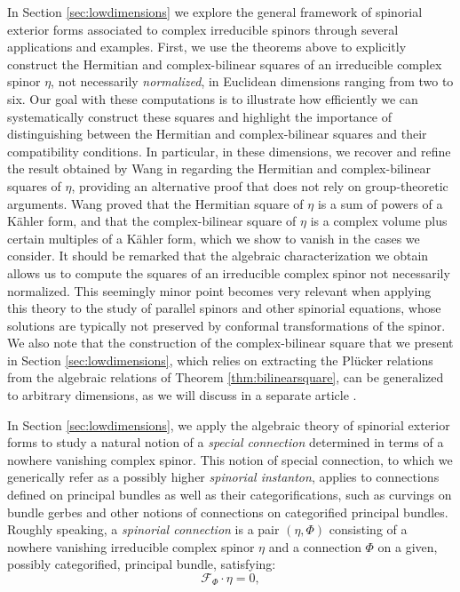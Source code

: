\documentclass[10pt,a4paper,twoside,reqno]{amsart}
\theoremstyle{plain}
\theoremstyle{definition}
\theoremstyle{remark}
\def\cF{\mathcal{F}}
\begin{document}
\noindent
In Section \ref{sec:lowdimensions} we explore the general framework of spinorial exterior forms associated to complex irreducible spinors through several applications and examples. First, we use the theorems above to explicitly construct the Hermitian and complex-bilinear squares of an irreducible complex spinor $\eta$, not necessarily \emph{normalized}, in Euclidean dimensions ranging from two to six. Our goal with these computations is to illustrate how efficiently we can systematically construct these squares and highlight the importance of distinguishing between the Hermitian and complex-bilinear squares and their compatibility conditions. In particular, in these dimensions, we recover and refine the result obtained by Wang in \cite{Wang89} regarding the Hermitian and complex-bilinear squares of $\eta$, providing an alternative proof that does not rely on group-theoretic arguments. Wang proved that the Hermitian square of $\eta$ is a sum of powers of a Kähler form, and that the complex-bilinear square of $\eta$ is a complex volume plus certain multiples of a Kähler form, which we show to vanish in the cases we consider. It should be remarked that the algebraic characterization we obtain allows us to compute the squares of an irreducible complex spinor not necessarily normalized. This seemingly minor point becomes very relevant when applying this theory to the study of parallel spinors and other spinorial equations, whose solutions are typically not preserved by conformal transformations of the spinor. We also note that the construction of the complex-bilinear square that we present in Section \ref{sec:lowdimensions}, which relies on extracting the Plücker relations from the algebraic relations of Theorem \ref{thm:bilinearsquare}, can be generalized to arbitrary dimensions, as we will discuss in a separate article \cite{PinoGilSha}.\medskip

\noindent
In Section \ref{sec:lowdimensions}, we apply the algebraic theory of spinorial exterior forms to study a natural notion of a \emph{special connection} determined in terms of a nowhere vanishing complex spinor. This notion of special connection, to which we generically refer as a possibly higher \emph{spinorial instanton}, applies to connections defined on principal bundles as well as their categorifications, such as curvings on bundle gerbes and other notions of connections on categorified principal bundles. Roughly speaking, a \emph{spinorial connection} is a pair $(\eta,\Phi)$ consisting of a nowhere vanishing irreducible complex spinor $\eta$ and a connection $\Phi$ on a given, possibly categorified, principal bundle, satisfying:
\begin{equation*}
\cF_{\Phi}\cdot \eta = 0,
\end{equation*}
\end{document}
